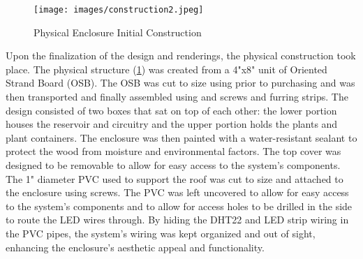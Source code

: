 \documentclass[12pt]{article} %
\begin{document}
\begin{figure}[H]
    \centering
    \texttt{[image: images/construction2.jpeg]}
    \caption{Physical Enclosure Initial Construction}
    \label{fig:initialconstruction}
\end{figure}
\noindent Upon the finalization of the design and renderings, the physical construction took place. The physical structure (\ref{fig:initialconstruction}) was created from a 4"x8" unit of Oriented Strand Board (OSB). The OSB was cut to size using prior to purchasing and was then transported and finally assembled using and screws and furring strips. The design consisted of two boxes that sat on top of each other: the lower portion houses the reservoir and circuitry and the upper portion holds the plants and plant containers. The enclosure was then painted with a water-resistant sealant to protect the wood from moisture and environmental factors. The top cover was designed to be removable to allow for easy access to the system's components. The 1" diameter PVC used to support the roof was cut to size and attached to the enclosure using screws. The PVC was left uncovered to allow for easy access to the system's components and to allow for access holes to be drilled in the side to route the LED wires through. By hiding the DHT22 and LED strip wiring in the PVC pipes, the system's wiring was kept organized and out of sight, enhancing the enclosure's aesthetic appeal and functionality.
\end{document}
